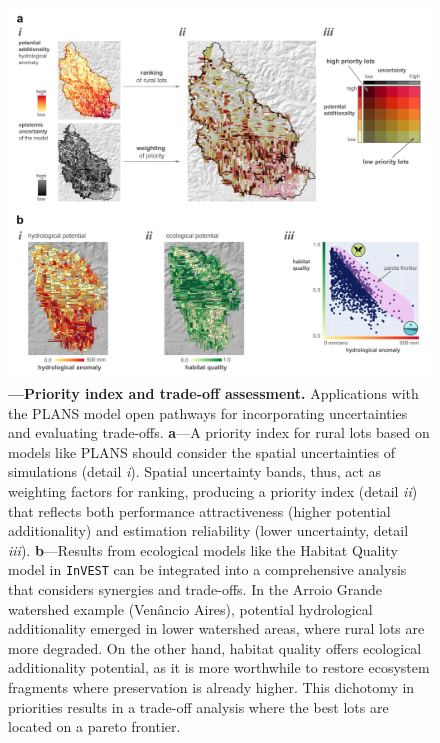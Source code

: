 \documentclass[./main_en.tex]{subfiles}
\begin{document}
\begin{figure}[t!] 
\centering				
\includegraphics[width=0.98\linewidth]{figs/fig_index_en.jpg}		
\caption[Priority index and trade-offs]
{\textbf{---\;Priority index and trade-off assessment.}
    Applications with the PLANS model open pathways for incorporating uncertainties and evaluating trade-offs.
    \;\textbf{a}\;---\;A priority index for rural lots based on models like PLANS should consider the spatial uncertainties of simulations (detail \textrm{\textit{i}}). Spatial uncertainty bands, thus, act as weighting factors for ranking, producing a priority index (detail \textrm{\textit{ii}}) that reflects both performance attractiveness (higher potential additionality) and estimation reliability (lower uncertainty, detail \textrm{\textit{iii}}).   
    \;\textbf{b}\;---\;Results from ecological models like the Habitat Quality model in \texttt{InVEST} can be integrated into a comprehensive analysis that considers synergies and trade-offs. In the Arroio Grande watershed example (Venâncio Aires), potential hydrological additionality emerged in lower watershed areas, where rural lots are more degraded. On the other hand, habitat quality offers ecological additionality potential, as it is more worthwhile to restore ecosystem fragments where preservation is already higher. This dichotomy in priorities results in a trade-off analysis where the best lots are located on a pareto frontier.
}
\label{fig:eco:addplans3} 		
\end{figure}
\end{document}
